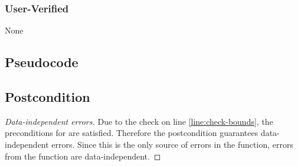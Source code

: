 \documentclass{article}
\begin{document}
\subsubsection*{User-Verified}
None

\subsection*{Pseudocode}


\subsection*{Postcondition}
\begin{theorem}
\end{theorem}

\begin{proof}[Data-independent errors]
    Due to the check on line \ref{line:check-bounds},
    the preconditions for  are satisfied.
    Therefore the postcondition guarantees data-independent errors.
    Since this is the only source of errors in the function, errors from the function are data-independent.
\end{proof}
\end{document}
